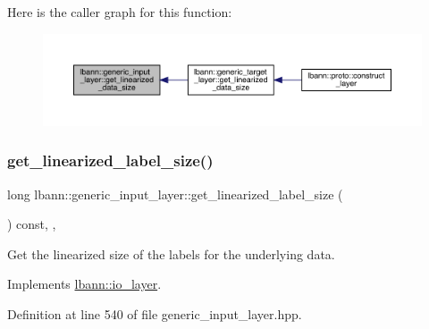 Here is the caller graph for this function\+:\nopagebreak
\begin{figure}[H]
\begin{center}
\leavevmode
\includegraphics[width=350pt]{classlbann_1_1generic__input__layer_aca46cbf29ad2762e9329b46ab2ad1ae7_icgraph}
\end{center}
\end{figure}
\mbox{\label{classlbann_1_1generic__input__layer_ab6c24db7e2b8e73e7d7894e51246dc5e}} 
\subsubsection{\texorpdfstring{get\+\_\+linearized\+\_\+label\+\_\+size()}{get\_linearized\_label\_size()}}
{\footnotesize\ttfamily long lbann\+::generic\+\_\+input\+\_\+layer\+::get\+\_\+linearized\+\_\+label\+\_\+size (\begin{DoxyParamCaption}{ }\end{DoxyParamCaption}) const\hspace{0.3cm}{\ttfamily [inline]}, {\ttfamily [override]}, {\ttfamily [virtual]}}

Get the linearized size of the labels for the underlying data. 

Implements \hyperlink{classlbann_1_1io__layer_a72a9a1411892b6f03de8b8f9923d77a6}{lbann\+::io\+\_\+layer}.



Definition at line 540 of file generic\+\_\+input\+\_\+layer.\+hpp.


